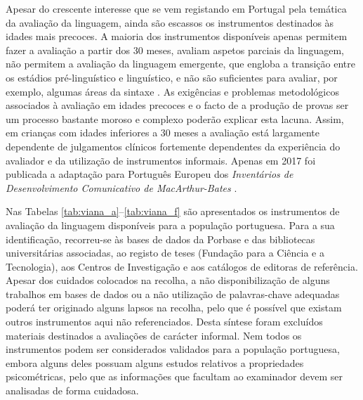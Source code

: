 \documentclass[output=paper]{LSP/langsci}
\begin{document}
Apesar do crescente interesse que se vem registando em Portugal pela temática da avaliação da linguagem, ainda são escassos os instrumentos destinados às idades mais precoces. A maioria dos instrumentos disponíveis apenas permitem fazer a avaliação a partir dos 30 meses, avaliam aspetos parciais da linguagem, não permitem a avaliação da linguagem emergente, que engloba a transição entre os estádios pré-linguístico e linguístico, e não são suficientes para avaliar, por exemplo, algumas áreas da sintaxe 
\citep{afonso_2011}. As exigências e problemas metodológicos associados à avaliação em idades precoces \citep{feldman_etlal2005,mariscal_etal2007} e o facto de a produção de provas ser um processo bastante moroso e complexo poderão explicar esta lacuna. Assim, em crianças com idades inferiores a 30 meses a avaliação está largamente dependente de julgamentos clínicos fortemente dependentes da experiência do avaliador e da utilização de instrumentos informais. Apenas em 2017 foi publicada a adaptação para Português Europeu dos \textit{Inventários de Desenvolvimento Comunicativo de MacArthur-Bates} \citep{viana_etal2017}.

Nas Tabelas \ref{tab:viana_a}--\ref{tab:viana_f} são apresentados os instrumentos de avaliação da linguagem disponíveis para a população portuguesa. Para a sua identificação, recorreu-se às bases de dados da Porbase e das bibliotecas universitárias associadas, ao registo de teses (Fundação para a Ciência e a Tecnologia), aos Centros de Investigação e aos catálogos de editoras de referência. Apesar dos cuidados colocados na recolha, a não disponibilização de alguns trabalhos em bases de dados ou a não utilização de palavras-chave adequadas poderá ter originado alguns lapsos na recolha, pelo que é possível que existam outros instrumentos aqui não referenciados. Desta síntese foram excluídos materiais destinados a avaliações de carácter informal. Nem todos os instrumentos podem ser considerados validados para a população portuguesa, embora alguns deles possuam alguns estudos relativos a propriedades psicométricas, pelo que as informações que facultam ao examinador devem ser analisadas de forma cuidadosa. 
\end{document}
